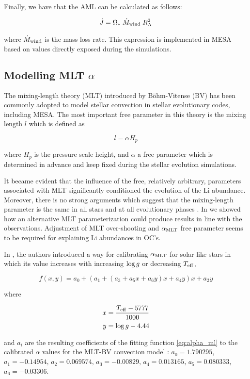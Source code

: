\documentclass[fleqn,usenatbib]{mnras}
\begin{document}
\begin{ceqn}
Finally, we have that the AML can be calculated as follows:
\begin{ceqn}
\begin{equation}
 \Dot{J} = \Omega_* \; \Dot{M}_{\mathrm{wind}} \; R_{\mathrm{A}}^{2} \label{eq:j_dot}
\end{equation}
\end{ceqn}
where $\Dot{M}_{\mathrm{wind}}$ is the mass loss rate. This expression is implemented in MESA based on values directly exposed during the simulations.

\subsection{Modelling MLT $\alpha$} \label{mod_mltalpha}
The mixing-length theory (MLT) introduced by Böhm-Vitense (BV) has been commonly adopted to model stellar convection in stellar evolutionary codes, including MESA. The most important free parameter in this theory is the mixing length $l$ which is defined as 
\begin{ceqn}
\begin{equation}
 l = \alpha H_p\label{eq:mixlength}
\end{equation}
\end{ceqn}
where $H_p$ is the pressure scale height, and $\alpha$ a free parameter which is determined in advance and keep fixed during the stellar evolution simulations.\par

 It became evident that the influence of the free, relatively arbitrary, parameters associated with MLT significantly conditioned the evolution of the Li abundance. Moreover, there is no strong arguments which suggest that the mixing-length parameter is the same in all stars and at all evolutionary phases \citep{Pasetto2014}. In \cite{Navarro2020} we showed how an alternative MLT parameterization could produce results in line with the observations. Adjustment of MLT over-shooting and $\alpha_{\mathrm{MLT}}$ free parameter seems to be required for explaining Li abundances in OC's.\par

In \cite{Sonoi2018}, the authors introduced a way for calibrating $\alpha_{\mathrm{MLT}}$ for solar-like stars in which its value increases with increasing $\mathrm{log} \, g$ or decreasing $T_{\mathrm{eff}}$,

\begin{ceqn}
\begin{equation}
 f(x,y) = a_0 + (a_1 + (a_3 + a_5x +a_6y)x + a_4y)x + a_2y\label{eq:alpha_ml}
\end{equation}
\end{ceqn}
where
\begin{ceqn}
\begin{align}
     x &= \frac{T_{\mathrm{eff}}-5777}{1000} \label{eq:eq:alpha_x}\\
     y &= \mathrm{log} \, g-4.44 \label{eq:eq:alpha_y}
\end{align}
\end{ceqn}
and $a_i$ are the resulting coefficients of the fitting function \ref{eq:alpha_ml} to the calibrated $\alpha$ values for the MLT-BV convection model \citep{Sonoi2018}: $a_0=1.790295$, $a_1=-0.14954$, $a_2=0.069574$, $a_3=-0.00829$, $a_4=0.013165$, $a_5=0.080333$, $a_6=-0.03306$.\par


\end{ceqn}
\end{document}
